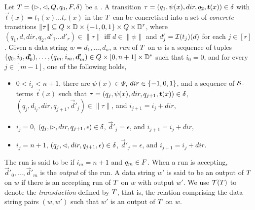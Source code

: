 Let $T=(\vartriangleright, \vartriangleleft, Q, q_0, F, \delta)$ be a \SST. 
A transition $\tau=(q_1,\psi(x), dir, q_2, \vec{t}(x)) \in \transrel$ with $\vec{t}(x) = t_1(x) \ldots t_r(x)$ in the \SST{} $T$ can be concretised
into a set of \emph{concrete} transitions $\|\tau\| \subseteq Q \times \mathbb{D} \times \{-1, 0, 1\} \times Q \times \mathbb{D}^r$, where $(q_1, d, dir, q_2, d'_1\ldots d'_r)  \in \|\tau\|$ iff $d \in \|\psi\|$ and $d'_j = \mathcal{I}(t_j)(d)$ for each $j \in [r]$.
%
Given a data string $w = d_1, \dots, d_n$, a \emph{run} of $T$ on $w$
is a sequence of tuples $(q_0, i_0, \vec{d}'_0), \ldots, (q_m, i_m, \vec{d}'_m) \in \controls \times [0, n+1] \times \data^*$ 
such that
    $i_0 = 0$, and
    for every $j \in [m-1]$, one of the following holds,
    \begin{itemize}
  	\item  $0< i_j < n+1$, there are $\psi(x) \in \Psi$, $dir \in \{-1, 0, 1\}$, and a sequence of  $\mathcal{S}$-terms $\vec{t}(x)$ such that $\tau=(q_j, \psi(x), dir, q_{j+1}, \vec{t}(x)) \in \transrel$, $(q_j, d_{i_j}, dir, q_{j+1}, \vec{d}'_j) \in \|\tau\|$, and $i_{j+1} = i_j + dir$,
	\item $i_j = 0$, $(q_j, \vartriangleright, dir, q_{j+1}, \epsilon) \in \delta$, $\vec{d}'_j  = \epsilon$, and $i_{j+1} = i_j + dir$, 
	\item $i_j = n+1$, $(q_j, \vartriangleleft, dir, q_{j+1}, \epsilon) \in \delta$,  $\vec{d}'_j  = \epsilon$, and $i_{j+1} =i_j + dir$.
  \end{itemize}
The run is said to be  if $i_m = n+1$ and $q_m \in F$. When a run is accepting, $\vec{d}'_0, \ldots, \vec{d}'_m$ is the \emph{output} of the run.
A data string $w'$ is said to be an output of $T$ on $w$ if there is an accepting run of
$T$ on $w$ with output $w'$. We use $\mathcal{T}(T)$ to denote the \emph{transduction} defined by $T$, that is, the relation comprising the data-string pairs $(w, w')$ such that $w'$ is an output of $T$ on $w$.
%

